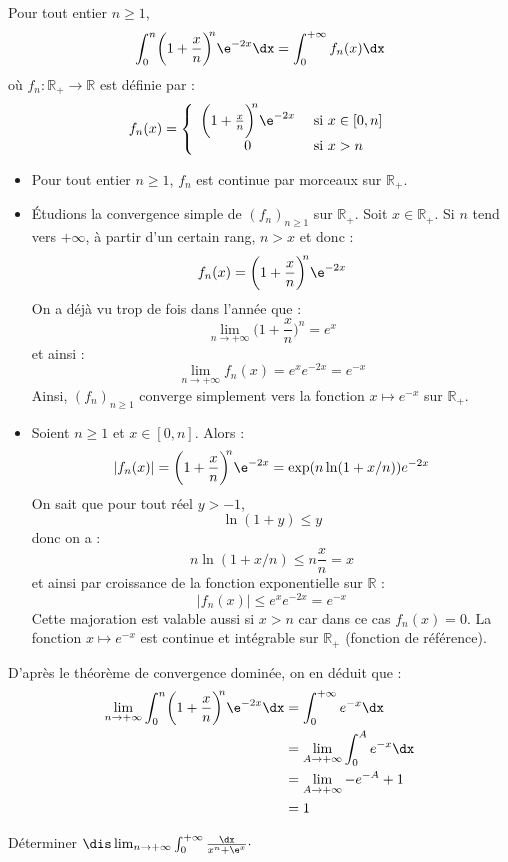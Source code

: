 \documentclass[a4paper,10pt]{report}
\begin{document}
\corr Pour tout entier $n \geq 1$,
$$ \int_{0}^{n} \biggl( 1 + \frac{x}{n} \biggr)^{\!\!n} \e^{ - 2x} \dx = \int_0^{+ \infty} f_n(x) \dx$$
où $f_n : \mathbb{R}_+ \rightarrow  \mathbb{R}$ est définie par :
$$ f_n(x) = \left\lbrace \begin{array}{cl}
\biggl( 1 + \frac{x}{n} \biggr)^{\!\!n} \e^{ - 2x} & \hbox{ si } x \in [0,n] \\
0 & \hbox{ si } x>n
\end{array}\right.$$
\begin{itemize}
\item Pour tout entier $n \geq 1$, $f_n$ est continue par morceaux sur $\mathbb{R}_+$.
\item Étudions la convergence simple de $(f_n)_{n \geq 1}$ sur $\mathbb{R}_+$. Soit $x \in \mathbb{R}_+$. Si $n$ tend vers $+ \infty$, à partir d'un certain rang, $n>x$ et donc :
$$ f_n(x) = \biggl( 1 + \frac{x}{n} \biggr)^{\!\!n} \e^{ - 2x}$$
On a déjà vu trop de fois dans l'année que :
$$ \lim_{n \rightarrow + \infty} \biggl( 1 + \frac{x}{n} \biggr)^{\!\!n} = e^x$$
et ainsi :
$$ \lim_{n \rightarrow + \infty} f_n(x) =e^x e^{-2x} = e^{-x}$$
Ainsi, $(f_n)_{n \geq 1}$ converge simplement vers la fonction $x \mapsto e^{-x}$ sur $\mathbb{R}_+$.
\item Soient $n \geq 1$ et $x \in [0,n]$. Alors :
$$ \vert f_n(x) \vert = \biggl( 1 + \frac{x}{n} \biggr)^{\!\!n} \e^{ - 2x} = \exp(n \ln(1+x/n)) e^{-2x}$$
On sait que pour tout réel $y>-1$,
$$ \ln(1+y) \leq y$$
donc on a :
$$ n \ln(1+x/n) \leq n\dfrac{x}{n} = x$$
et ainsi par croissance de la fonction exponentielle sur $\mathbb{R}$ :
$$ \vert f_n(x) \vert  \leq e^{x} e^{-2x} = e^{-x}$$
Cette majoration est valable aussi si $x>n$ car dans ce cas $f_n(x)=0$. La fonction $x \mapsto e^{-x}$ est continue et intégrable sur $\mathbb{R}_+$ (fonction de référence).
\end{itemize}
D'après le théorème de convergence dominée, on en déduit que :
\begin{align*}
\lim_{n \to + \infty} \int_{0}^{n} \biggl( 1 + \frac{x}{n} \biggr)^{\!\!n} \e^{ - 2x} \dx & = \int_0^{+ \infty} e^{-x} \dx \\
& = \lim_{A \rightarrow + \infty} \int_0^A e^{-x} \dx \\
&  = \lim_{A \rightarrow + \infty} -e^{-A}+1 \\
& = 1
\end{align*}


 \begin{Exa} Déterminer $\dis \lim_{n \rightarrow + \infty} \int_{0}^{ + \infty} \frac{\dx}{x^{n} + \e^{x}} \cdot$
 \end{Exa}
 
\end{document}
